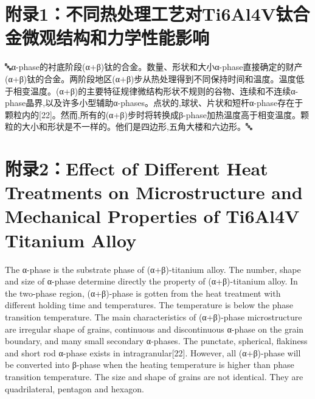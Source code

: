\chapter{附录1：不同热处理工艺对Ti6Al4V钛合金微观结构和力学性能影响}

🔤α-phase的衬底阶段(α+β)钛的合金。数量、形状和大小α-phase直接确定的财产(α+β)钛的合金。两阶段地区(α+β)步从热处理得到不同保持时间和温度。温度低于相变温度。(α+β)的主要特征规律微结构形状不规则的谷物、连续和不连续α-phase晶界,以及许多小型辅助α-phases。点状的,球状、片状和短杆α-phase存在于颗粒内的[22]。然而,所有的(α+β)步时将转换成β-phase加热温度高于相变温度。颗粒的大小和形状是不一样的。他们是四边形,五角大楼和六边形。🔤
\chapter{附录2：Effect of Different Heat Treatments on Microstructure and Mechanical Properties of Ti6Al4V Titanium Alloy}
The α-phase is the substrate phase of (α+β)-titanium alloy. The number, shape and size of α-phase determine directly the property of (α+β)-titanium alloy. In the two-phase region, (α+β)-phase is gotten from the heat treatment with different holding time and temperatures. The temperature is below the phase transition temperature. The main characteristics of (α+β)-phase microstructure are irregular shape of grains, continuous and discontinuous α-phase on the grain boundary, and many small secondary α-phases. The punctate, spherical, flakiness and short rod α-phase exists in intragranular[22]. However, all (α+β)-phase will be converted into β-phase when the heating temperature is higher than phase transition temperature. The size and shape of grains are not identical. They are quadrilateral, pentagon and hexagon.
%
%
%
